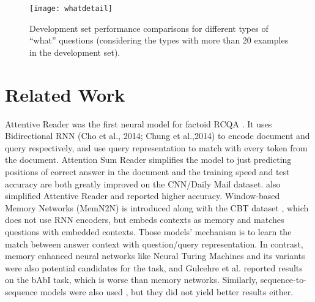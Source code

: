\documentclass[letterpaper]{article}
\begin{document}
\begin{figure}
\begin{center}
\texttt{[image: whatdetail]}
\caption{Development set performance comparisons for different types of ``what'' questions (considering the types with more than 20 examples in the development set).}
\label{whatdetail}
\end{center}
\end{figure}

\section{Related Work}
\label{sect_related}










Attentive Reader was the first neural model for factoid RCQA \cite{hermann2015teaching}. It uses Bidirectional RNN (Cho et al., 2014; Chung et al.,2014) to encode document and query respectively, and use query representation to match with every token from the document. Attention Sum Reader \cite{kadlec2016text} simplifies the model to just predicting positions of correct answer in the document and the training speed and test accuracy are both greatly improved on the CNN/Daily Mail dataset. \cite{chen2016thorough} also simplified Attentive Reader and reported higher accuracy. Window-based Memory Networks (MemN2N) is introduced along with the CBT dataset \cite{hill2015goldilocks}, which does not use RNN encoders, but embeds contexts as memory and matches questions with embedded contexts. 
Those models' mechanism is to learn the match between answer context with question/query representation. In contrast, memory enhanced neural networks  like Neural Turing Machines \cite{graves2014neural} and its variants \cite{zhang2015structured,gulcehre2016dynamic,zaremba2015reinforcement} were also potential candidates for the task, and Gulcehre et al.  reported results on the bAbI task, which is worse than memory networks. Similarly, sequence-to-sequence models were also used \cite{yu2015empirical,hermann2015teaching}, but they did not yield better results either. 
\end{document}

